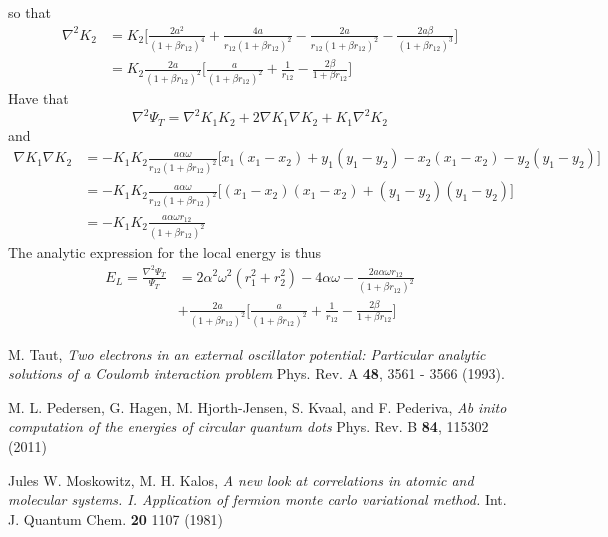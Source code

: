 \documentclass[english, a4paper]{article}
\begin{document}
so that
\begin{align}
 \nabla^2 K_2 &= K_2\Biggr[\frac{2a^2}{(1 + \beta r_{12})^4} + \frac{4a}{r_{12}(1 + \beta r_{12})^2}
              - \frac{2a}{r_{12}(1 + \beta r_{12})^2} - \frac{2a\beta}{(1 + \beta r_{12})^3} \Biggr] \\
              &= K_2\frac{2a}{(1+\beta r_{12})^2}\Biggr[ \frac{a}{(1+\beta r_{12})^2} + 
              \frac{1}{r_{12}} - \frac{2\beta}{1 + \beta r_{12}} \Biggr]
\end{align}
Have that
\begin{equation}
 \nabla^2 \Psi_T = \nabla^2K_1K_2 + 2\nabla K_1\nabla K_2 + K_1\nabla^2K_2
\end{equation}
and
\begin{align}
 \nabla K_1 \nabla K_2 &= -K_1K_2 \frac{a\alpha \omega}{r_{12}(1+\beta r_{12})^2}
 \Bigr[x_1(x_1 - x_2) + y_1(y_1 - y_2) - x_2(x_1 - x_2) - y_2(y_1 - y_2)\Bigr] \\
 &= -K_1K_2 \frac{a\alpha \omega}{r_{12}(1+\beta r_{12})^2}
 \Bigr[(x_1 - x_2)(x_1 - x_2) + (y_1 - y_2)(y_1 - y_2)\Bigr] \\
 &= -K_1K_2 \frac{a\alpha \omega r_{12}}{(1+\beta r_{12})^2}
\end{align}
The analytic expression for the local energy is thus
\begin{align}
 E_L = \frac{\nabla^2\Psi_T}{\Psi_T} &= 2\alpha^2 \omega^2(r_1^2 + r_2^2) - 4\alpha \omega
 - \frac{2a\alpha \omega r_{12}}{(1+\beta r_{12})^2} \\
 &+ \frac{2a}{(1+\beta r_{12})^2}\Biggr[ \frac{a}{(1+\beta r_{12})^2} + 
              \frac{1}{r_{12}} - \frac{2\beta}{1 + \beta r_{12}} \Biggr]
\end{align}



















\begin{thebibliography}{9}


 M. Taut, 
 \textit{Two electrons in an external oscillator potential: Particular analytic solutions
 of a Coulomb interaction problem}
 Phys. Rev. A {\bf 48}, 3561 - 3566 (1993).
 
 M. L. Pedersen, G. Hagen, M. Hjorth-Jensen, S. Kvaal, and F. Pederiva, 
 \textit{Ab inito computation of the energies of circular quantum dots}
 Phys. Rev. B {\bf 84}, 115302 (2011)
 
 Jules W. Moskowitz, M. H. Kalos,
 \textit{A new look at correlations in atomic and molecular systems. 
         I. Application of fermion monte carlo variational method.}
 Int. J. Quantum Chem. {\bf 20} 1107 (1981)

\end{thebibliography}
\end{document}
